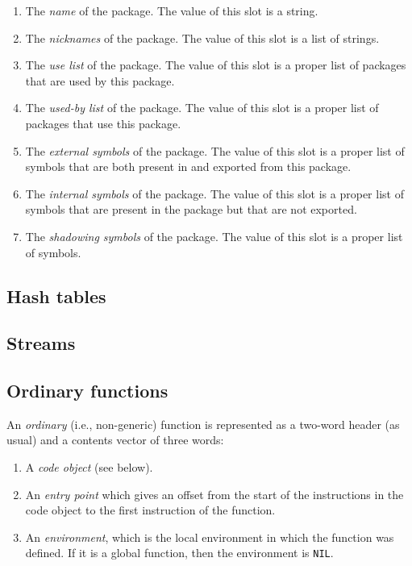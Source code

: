 \begin{enumerate}
\item The \emph{name} of the package.  The value of this slot is a
  string.
\item The \emph{nicknames} of the package.  The value of this slot is
  a list of strings. 
\item The \emph{use list} of the package.  The value of this slot is a
  proper list of packages that are used by this package. 
\item The \emph{used-by list} of the package.  The value of this slot
is a proper list of packages that use this package. 
\item The \emph{external symbols} of the package.  The value of this
  slot is a proper list of symbols that are both present in and
  exported from this package.
\item The \emph{internal symbols} of the package.  The value of this
  slot is a proper list of symbols that are present in the package but
  that are not exported.
\item The \emph{shadowing symbols} of the package.  The value of this
  slot is a proper list of symbols. 
\end{enumerate}

\subsection{Hash tables}

\subsection{Streams}

\subsection{Ordinary functions}

An \emph{ordinary} (i.e., non-generic) function is represented as a
two-word header (as usual) and a contents vector of three words:

\begin{enumerate}
\item A \emph{code object} (see below).
\item An \emph{entry point} which gives an offset from the start of
  the instructions in the code object to the first instruction of the
  function. 
\item An \emph{environment}, which is the local environment in which
  the function was defined. If it is a global function, then the
  environment is \texttt{NIL}. 
\end{enumerate}

